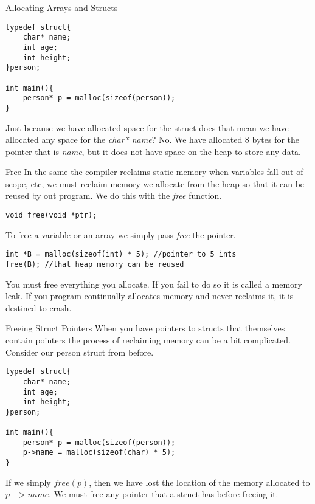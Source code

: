 \documentclass[10pt]{beamer}
\begin{document}
\begin{frame}[fragile]{Allocating Arrays and Structs}
\begin{verbatim}
typedef struct{
	char* name;
	int age;
	int height;
}person;

int main(){
	person* p = malloc(sizeof(person));
}
\end{verbatim}
Just because we have allocated space for the struct does that mean we have allocated any space for the {\it char* name}? No. We have allocated 8 bytes for the pointer that is {\it name}, but it does not have space on the heap to store any data.
\end{frame}

\begin{frame}[fragile]{Free}
In the same the compiler reclaims static memory when variables fall out of scope, etc, we must reclaim memory we allocate from the heap so that it can be reused by out program. We do this with the {\it free} function.

\begin{verbatim}
void free(void *ptr);
\end{verbatim}

To free a variable or an array we simply pass {\it free} the pointer.
\begin{verbatim}
int *B = malloc(sizeof(int) * 5); //pointer to 5 ints
free(B); //that heap memory can be reused
\end{verbatim}
You must free everything you allocate. If you fail to do so it is called a memory leak. If you program continually allocates memory and never reclaims it, it is destined to crash.
\end{frame}

\begin{frame}[fragile]{Freeing Struct Pointers} 
When you have pointers to structs that themselves contain pointers the process of reclaiming memory can be a bit complicated. Consider our person struct from before.
\begin{verbatim}
typedef struct{
	char* name;
	int age;
	int height;
}person;

int main(){
	person* p = malloc(sizeof(person));
	p->name = malloc(sizeof(char) * 5);
}
\end{verbatim}
If we simply $free(p)$, then we have lost the location of the memory allocated to $p->name$. We must free any pointer that a struct has before freeing it.
\end{frame}
\end{document}
